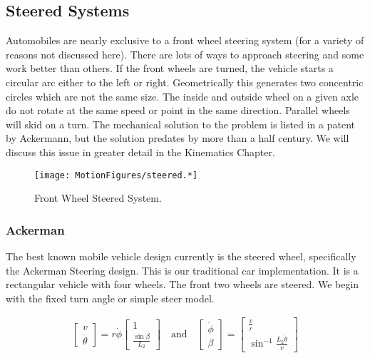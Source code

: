 \hypertarget{steered-systems}{%
\subsection{Steered Systems}\label{steered-systems}}

Automobiles are nearly exclusive to a front wheel steering system (for a
variety of reasons not discussed here). There are lots of ways to
approach steering and some work better than others. If the front wheels
are turned, the vehicle starts a circular arc either to the left or
right. Geometrically this generates two concentric circles which are not
the same size. The inside and outside wheel on a given axle do not
rotate at the same speed or point in the same direction. Parallel wheels
will skid on a turn. The mechanical solution to the problem is listed in
a patent by Ackermann, but the solution predates by more than a half
century. We will discuss this issue in greater detail in the Kinematics
Chapter.

\begin{figure}
\centering
\texttt{[image: MotionFigures/steered.*]}
\caption{Front Wheel Steered System.}
\end{figure}

\hypertarget{ackerman}{%
\subsubsection{Ackerman}\label{ackerman}}

The best known mobile vehicle design currently is the steered wheel,
specifically the Ackerman Steering design. This is our traditional car
implementation. It is a rectangular vehicle with four wheels. The front
two wheels are steered. We begin with the fixed turn angle or simple
steer model.

\[\begin{aligned}
\displaystyle
\begin{bmatrix} v \\ \dot{\theta} \end{bmatrix}
=  r \dot{\phi}
\begin{bmatrix} 1 \\ \displaystyle \frac{\sin \beta}{L_2} \end{bmatrix}
\quad \mbox{and} \quad
\begin{bmatrix} \dot{\phi}  \\ \beta \end{bmatrix}
=
\begin{bmatrix}\displaystyle  \frac{v}{r} \\ \displaystyle \sin^{-1} \frac{L_2 \dot{\theta}}{v} \end{bmatrix}
\end{aligned}\]

